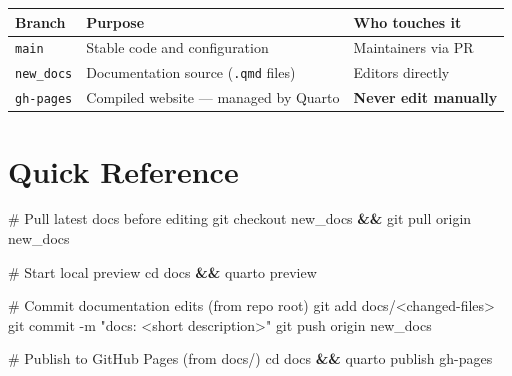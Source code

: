 \documentclass[
  letterpaper,
  DIV=11,
  numbers=noendperiod]{scrreprt}
\newenvironment{Shaded}{\begin{snugshade}}{\end{snugshade}}
\newcommand{\AttributeTok}[1]{\textcolor[rgb]{0.40,0.45,0.13}{#1}}
\newcommand{\BuiltInTok}[1]{\textcolor[rgb]{0.00,0.23,0.31}{#1}}
\newcommand{\CommentTok}[1]{\textcolor[rgb]{0.37,0.37,0.37}{#1}}
\newcommand{\ExtensionTok}[1]{\textcolor[rgb]{0.00,0.23,0.31}{#1}}
\newcommand{\FunctionTok}[1]{\textcolor[rgb]{0.28,0.35,0.67}{#1}}
\newcommand{\KeywordTok}[1]{\textcolor[rgb]{0.00,0.23,0.31}{\textbf{#1}}}
\newcommand{\NormalTok}[1]{\textcolor[rgb]{0.00,0.23,0.31}{#1}}
\newcommand{\OperatorTok}[1]{\textcolor[rgb]{0.37,0.37,0.37}{#1}}
\newcommand{\StringTok}[1]{\textcolor[rgb]{0.13,0.47,0.30}{#1}}
\newcounter{none} %
\begin{document}
{\def\LTcaptype{none} %
\begin{longtable}[]{@{}
  >{\raggedright\arraybackslash}p{}
  >{\raggedright\arraybackslash}p{}
  >{\raggedright\arraybackslash}p{}@{}}
\toprule\noalign{}
\begin{minipage}[b]{\linewidth}\raggedright
Branch
\end{minipage} & \begin{minipage}[b]{\linewidth}\raggedright
Purpose
\end{minipage} & \begin{minipage}[b]{\linewidth}\raggedright
Who touches it
\end{minipage} \\
\midrule\noalign{}
\endhead
\bottomrule\noalign{}
\endlastfoot
\texttt{main} & Stable code and configuration & Maintainers via PR \\
\texttt{new\_docs} & Documentation source (\texttt{.qmd} files) &
Editors directly \\
\texttt{gh-pages} & Compiled website --- managed by Quarto &
\textbf{Never edit manually} \\
\end{longtable}
}

\section{Quick Reference}\label{quick-reference}

\begin{Shaded}
\begin{Highlighting}[]
\CommentTok{\# Pull latest docs before editing}
\FunctionTok{git}\NormalTok{ checkout new\_docs }\KeywordTok{\&\&} \FunctionTok{git}\NormalTok{ pull origin new\_docs}

\CommentTok{\# Start local preview}
\BuiltInTok{cd}\NormalTok{ docs }\KeywordTok{\&\&} \ExtensionTok{quarto}\NormalTok{ preview}

\CommentTok{\# Commit documentation edits (from repo root)}
\FunctionTok{git}\NormalTok{ add docs/}\OperatorTok{\textless{}}\NormalTok{changed{-}files}\OperatorTok{\textgreater{}}
\FunctionTok{git}\NormalTok{ commit }\AttributeTok{{-}m} \StringTok{"docs: \textless{}short description\textgreater{}"}
\FunctionTok{git}\NormalTok{ push origin new\_docs}

\CommentTok{\# Publish to GitHub Pages (from docs/)}
\BuiltInTok{cd}\NormalTok{ docs }\KeywordTok{\&\&} \ExtensionTok{quarto}\NormalTok{ publish gh{-}pages}
\end{Highlighting}
\end{Shaded}
\end{document}
